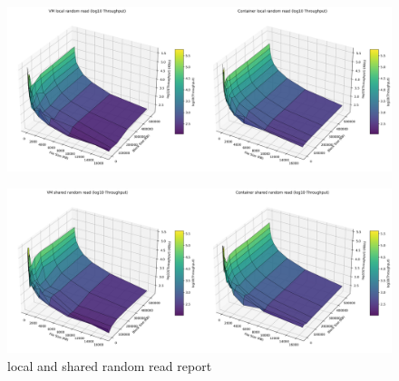 \begin{figure}[H]
    \centering
    \includegraphics[width=\linewidth]{assets/VM local random read_Container local random read_log_surfaces.png}
        \end{figure}
\begin{figure}[H]
    \centering
    \includegraphics[width=\linewidth]{assets/VM shared random read_Container shared random read_log_surfaces.png}
    \caption{local and shared random read report}
    \label{fig:random read local and shared}
\end{figure}

